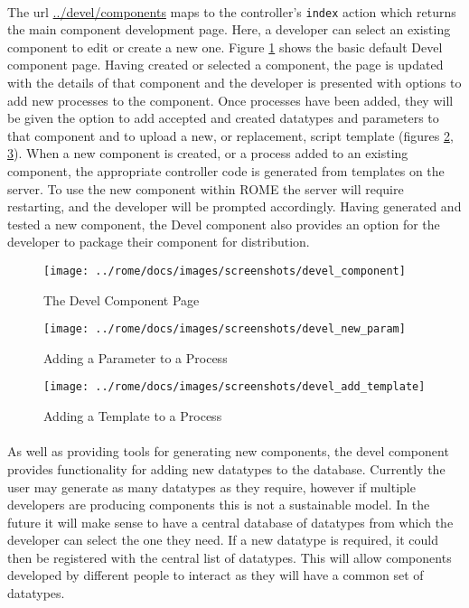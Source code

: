 \paragraph{}
The url \url{../devel/components} maps to the controller's \texttt{index} action which returns the main component development page. Here, a developer can select an existing component to edit or create a new one. Figure \ref{fig:devel_component} shows the basic default Devel component page. Having created or selected a component, the page is updated with the details of that component and the developer is presented with options to add new processes to the component. Once processes have been added, they will be given the option to add accepted and created datatypes and parameters to that component and to upload a new, or replacement, script template (figures \ref{fig:devel_new_param}, \ref{fig:devel_add_template}). When a new component is created, or a process added to an existing component, the appropriate controller code is generated from templates on the server. To use the new component within ROME the server will require restarting, and the developer will be prompted accordingly. Having generated and tested a new component, the Devel component also provides an option for the developer to package their component for distribution.


\begin{figure}[h]
\centering
\texttt{[image: ../rome/docs/images/screenshots/devel\_component]}
\caption{The Devel Component Page}\label{fig:devel_component}
\end{figure}
\clearpage

\begin{figure}[h]
\centering
\texttt{[image: ../rome/docs/images/screenshots/devel\_new\_param]}
\caption{Adding a Parameter to a Process}\label{fig:devel_new_param}
\end{figure}

\begin{figure}[h]
\centering
\texttt{[image: ../rome/docs/images/screenshots/devel\_add\_template]}
\caption{Adding a Template to a Process}\label{fig:devel_add_template}
\end{figure}
\clearpage

\paragraph{}
As well as providing tools for generating new components, the devel component provides functionality for adding new datatypes to the database. Currently the user may generate as many datatypes as they require, however if multiple developers are producing components this is not a sustainable model. In the future it will make sense to have a central database of datatypes from which the developer can select the one they need. If a new datatype is required, it could then be registered with the central list of datatypes. This will allow components developed by different people to interact as they will have a common set of datatypes.

